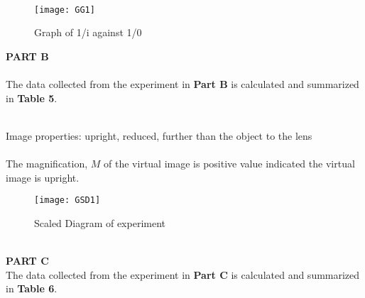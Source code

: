 \documentclass[a4paper,11pt]{article}
\begin{document}
\\
\begin{figure}[h!]
\centering
\texttt{[image: GG1]}
\caption{Graph of 1/i against 1/0}
\label{6}
\end{figure}

\newpage
\noindent\textbf{PART B}\\
\\
The data collected from the experiment in \textbf{Part B} is calculated and summarized in \textbf{Table 5}.
\\
\begin{table}[h!]
\centering
\caption{Experimental data for Part B}
\label{your-label}
\end{table}
\\
\noindent Image properties: upright, reduced, further than the object to the lens\\		
\\
The magnification, \(M\) of the virtual image is positive value indicated the virtual image is upright.
\\
\begin{figure}[htbp]
\centering
\texttt{[image: GSD1]}
\caption{Scaled Diagram of experiment}
\label{6}
\end{figure}
\\
\textbf{PART C}
\\
The data collected from the experiment in \textbf{Part C} is calculated and summarized in \textbf{Table 6}.
\begin{table}[htbp]
\centering
\caption{Experimental data for Part C}
\label{your-label}
\end{table}
\end{document}
